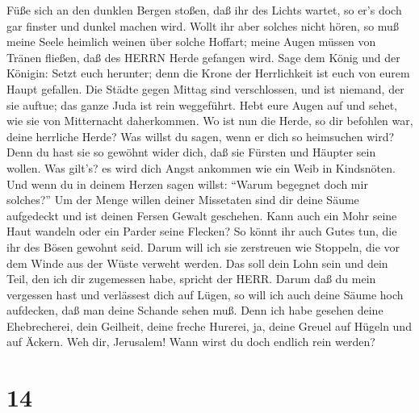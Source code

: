 Füße sich an den dunklen Bergen stoßen, daß ihr des Lichts wartet, so
er's doch gar finster und dunkel machen wird.  Wollt ihr
aber solches nicht hören, so muß meine Seele heimlich weinen über solche
Hoffart; meine Augen müssen von Tränen fließen, daß des HERRN Herde
gefangen wird.  Sage dem König und der Königin: Setzt euch
herunter; denn die Krone der Herrlichkeit ist euch von eurem Haupt
gefallen.  Die Städte gegen Mittag sind verschlossen, und
ist niemand, der sie auftue; das ganze Juda ist rein weggeführt.
 Hebt eure Augen auf und sehet, wie sie von Mitternacht
daherkommen. Wo ist nun die Herde, so dir befohlen war, deine herrliche
Herde?  Was willst du sagen, wenn er dich so heimsuchen
wird? Denn du hast sie so gewöhnt wider dich, daß sie Fürsten und
Häupter sein wollen. Was gilt's? es wird dich Angst ankommen wie ein
Weib in Kindsnöten.  Und wenn du in deinem Herzen sagen
willst: ``Warum begegnet doch mir solches?'' Um der Menge willen deiner
Missetaten sind dir deine Säume aufgedeckt und ist deinen Fersen Gewalt
geschehen.  Kann auch ein Mohr seine Haut wandeln oder ein
Parder seine Flecken? So könnt ihr auch Gutes tun, die ihr des Bösen
gewohnt seid.  Darum will ich sie zerstreuen wie Stoppeln,
die vor dem Winde aus der Wüste verweht werden.  Das soll
dein Lohn sein und dein Teil, den ich dir zugemessen habe, spricht der
HERR. Darum daß du mein vergessen hast und verlässest dich auf Lügen,
 so will ich auch deine Säume hoch aufdecken, daß man deine
Schande sehen muß.  Denn ich habe gesehen deine
Ehebrecherei, dein Geilheit, deine freche Hurerei, ja, deine Greuel auf
Hügeln und auf Äckern. Weh dir, Jerusalem! Wann wirst du doch endlich
rein werden?

\hypertarget{section-13}{%
\section{14}\label{section-13}}

